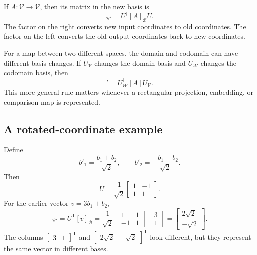 If \(A:\mathcal V\rightarrow\mathcal V\), then its matrix in the new basis is
\begin{equation}
  [A]_{\mathcal B'}
  =U^{\dagger}[A]_{\mathcal B}U.
  \label{eq:training-operator-basis-change}
\end{equation}
The factor on the right converts new input coordinates to old coordinates. The
factor on the left converts the old output coordinates back to new coordinates.

For a map between two different spaces, the domain and codomain can have
different basis changes. If \(U_{\mathcal V}\) changes the domain basis and
\(U_{\mathcal W}\) changes the codomain basis, then
\begin{equation}
  [A]'
  =U_{\mathcal W}^{\dagger}[A]U_{\mathcal V}.
  \label{eq:training-rectangular-basis-change}
\end{equation}
This more general rule matters whenever a rectangular projection, embedding,
or comparison map is represented.

\subsection{A rotated-coordinate example}

Define
\begin{equation}
  b'_1=\frac{b_1+b_2}{\sqrt2},
  \qquad
  b'_2=\frac{-b_1+b_2}{\sqrt2}.
\end{equation}
Then
\begin{equation}
  U=\frac{1}{\sqrt2}
  \begin{bmatrix}
    1 & -1\\
    1 & 1
  \end{bmatrix}.
\end{equation}
For the earlier vector \(v=3b_1+b_2\),
\begin{equation}
  [v]_{\mathcal B'}
  =U^{\mathsf T}[v]_{\mathcal B}
  =\frac{1}{\sqrt2}
   \begin{bmatrix}
     1 & 1\\
     -1 & 1
   \end{bmatrix}
   \begin{bmatrix}3\\1\end{bmatrix}
  =\begin{bmatrix}2\sqrt2\\-\sqrt2\end{bmatrix}.
\end{equation}
The columns \(\begin{bmatrix}3&1\end{bmatrix}^{\mathsf T}\) and
\(\begin{bmatrix}2\sqrt2&-\sqrt2\end{bmatrix}^{\mathsf T}\) look different,
but they represent the same vector in different bases.

